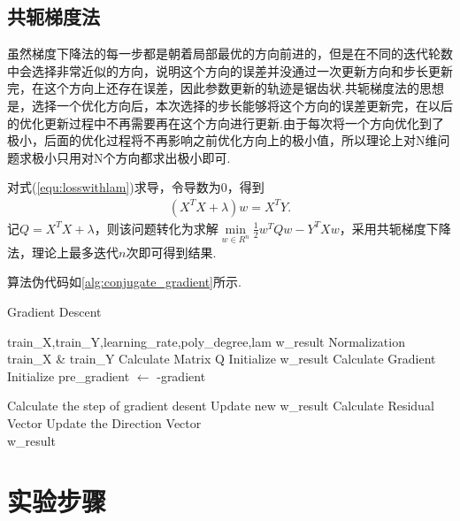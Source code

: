 \documentclass{hitreport}
\begin{document}
\subsection{共轭梯度法}\label{sec:cg}

虽然梯度下降法的每一步都是朝着局部最优的方向前进的，但是在不同的迭代轮数中会选择非常近似的方向，说明这个方向的误差并没通过一次更新方向和步长更新完，在这个方向上还存在误差，因此参数更新的轨迹是锯齿状.共轭梯度法的思想是，选择一个优化方向后，本次选择的步长能够将这个方向的误差更新完，在以后的优化更新过程中不再需要再在这个方向进行更新.由于每次将一个方向优化到了极小，后面的优化过程将不再影响之前优化方向上的极小值，所以理论上对N维问题求极小只用对N个方向都求出极小即可.

对式(\ref{equ:losswithlam})求导，令导数为0，得到
\begin{align}
\left(X^{T}X+\lambda \right)w = X^{T}Y.
\end{align}
记$Q=X^{T}X+\lambda $，则该问题转化为求解$\underset{w\in R^n}{\min}\frac{1}{2}w^TQw-Y^TXw$，采用共轭梯度下降法，理论上最多迭代$n$次即可得到结果.

算法伪代码如\ref{alg:conjugate_gradient}所示.

\begin{center}
\begin{minipage}{11cm}
\begin{algorithm}[H]  
  \caption{Gradient Descent}  
  \label{alg:conjugate_gradient}  
  \begin{algorithmic}  
    \Require  
    train\_X,train\_Y,learning\_rate,poly\_degree,lam
    \Ensure  
   	w\_result
   	\State Normalization train\_X \& train\_Y
   	\State Calculate Matrix Q
   	\State Initialize w\_result
   	\State Calculate Gradient
   	\State Initialize pre\_gradient $\leftarrow$ -gradient
   	
   		\State Calculate the step of gradient desent
   		\State Update new w\_result
   		\State Calculate Residual Vector
   		\State Update the Direction Vector
   	\EndFor\\
   	\Return w\_result
  \end{algorithmic}  
\end{algorithm}
\end{minipage}
\end{center}



\section{实验步骤}
\end{document}
